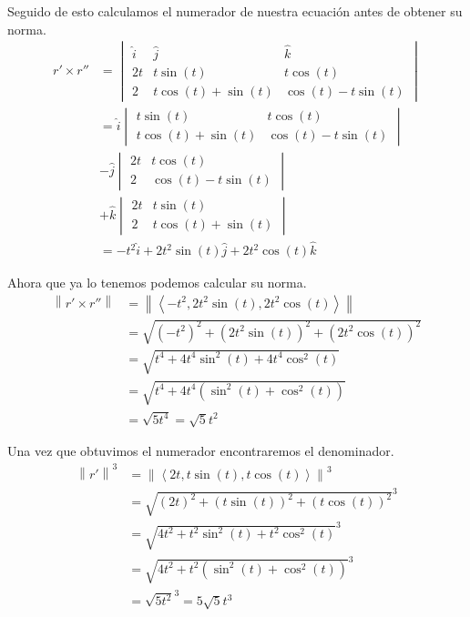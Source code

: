 \documentclass{article}
\newcommand{\norm}[1]{\left\lVert#1\right\rVert}
\newcommand{\custvec}[1]{\left\langle#1\right\rangle}
\begin{document}
Seguido de esto calculamos el numerador de nuestra ecuación antes de obtener su norma.
\begin{equation*}
    \begin{split}
        r' \times r''&= \begin{vmatrix}
                \hat{i} & \hat{j} & \hat{k} \\
                2t & t\sin (t) & t\cos (t) \\
                2 & t\cos (t) + \sin (t) & \cos (t) - t\sin (t)
            \end{vmatrix}\\
            &=\hat{i}\begin{vmatrix}
                t\sin (t) & t\cos (t) \\
                t\cos (t) + \sin (t) & \cos (t) - t\sin (t)
            \end{vmatrix}\\
            &-\hat{j}\begin{vmatrix}
                2t & t \cos (t) \\
                2 & \cos (t)-t\sin (t)
            \end{vmatrix}\\
            &+\hat{k}\begin{vmatrix}
                2t & t\sin (t) \\
                2 & t\cos (t) + \sin (t)
            \end{vmatrix} \\
            &=-t^2\hat{i}+2t^2\sin (t)\hat{j}+2t^2\cos (t)\hat{k}
    \end{split}
\end{equation*}

Ahora que ya lo tenemos podemos calcular su norma.
\begin{equation*}
    \begin{split}
        \norm{r' \times r''}&=\norm{\custvec{-t^2,2t^2\sin (t), 2t^2\cos (t)}} \\
        &=\sqrt{(-t^2)^2+(2t^2\sin  (t))^2+(2t^2\cos (t))^2} \\
        &=\sqrt{t^4+4t^4\sin^2(t)+4t^4\cos^2(t)} \\
        &=\sqrt{t^4+4t^4(\sin^2(t)+\cos^2(t))} \\
        &=\sqrt{5t^4}=\sqrt{5}t^2
    \end{split}
\end{equation*}

Una vez que obtuvimos el numerador encontraremos el denominador.
\begin{equation*}
    \begin{split}
        \norm{r'}^3&=\norm{\custvec{2t, t\sin (t), t\cos (t)}}^3 \\
        &=\sqrt{(2t)^2+(t\sin (t))^2+(t\cos (t))^2}^3 \\
        &=\sqrt{4t^2+t^2\sin^2(t)+t^2\cos^2(t)}^3 \\
        &=\sqrt{4t^2+t^2(\sin^2(t)+\cos^2(t))}^3 \\
        &=\sqrt{5t^2}^3=5\sqrt{5}t^3
    \end{split}
\end{equation*}
\end{document}
